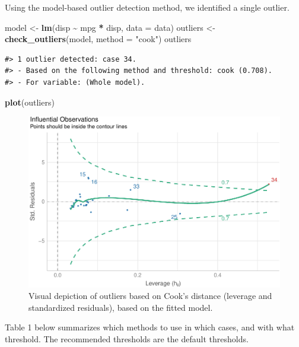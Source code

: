 \documentclass[sn-basic, lineno,pdflatex]{sn-jnl}
\newenvironment{Shaded}{\begin{snugshade}}{\end{snugshade}}
\newcommand{\AttributeTok}[1]{\textcolor[rgb]{0.13,0.29,0.53}{#1}}
\newcommand{\FunctionTok}[1]{\textcolor[rgb]{0.13,0.29,0.53}{\textbf{#1}}}
\newcommand{\NormalTok}[1]{#1}
\newcommand{\OtherTok}[1]{\textcolor[rgb]{0.56,0.35,0.01}{#1}}
\newcommand{\SpecialCharTok}[1]{\textcolor[rgb]{0.81,0.36,0.00}{\textbf{#1}}}
\newcommand{\StringTok}[1]{\textcolor[rgb]{0.31,0.60,0.02}{#1}}
\begin{document}
Using the model-based outlier detection method, we identified a single
outlier.

\begin{Shaded}
\begin{Highlighting}[]
\NormalTok{model }\OtherTok{\textless{}{-}} \FunctionTok{lm}\NormalTok{(disp }\SpecialCharTok{\textasciitilde{}}\NormalTok{ mpg }\SpecialCharTok{*}\NormalTok{ disp, }\AttributeTok{data =}\NormalTok{ data)}
\NormalTok{outliers }\OtherTok{\textless{}{-}} \FunctionTok{check\_outliers}\NormalTok{(model, }\AttributeTok{method =} \StringTok{"cook"}\NormalTok{)}
\NormalTok{outliers}
\end{Highlighting}
\end{Shaded}

\begin{verbatim}
#> 1 outlier detected: case 34.
#> - Based on the following method and threshold: cook (0.708).
#> - For variable: (Whole model).
\end{verbatim}

\begin{Shaded}
\begin{Highlighting}[]
\FunctionTok{plot}\NormalTok{(outliers)}
\end{Highlighting}
\end{Shaded}

\begin{figure}
\includegraphics[width=1\linewidth]{paper_files/figure-latex/model_fig-1} \caption{Visual depiction of outliers based on Cook's distance (leverage and standardized residuals), based on the fitted model.}\label{fig:model_fig}
\end{figure}

Table 1 below summarizes which methods to use in which cases, and with
what threshold. The recommended thresholds are the default thresholds.
\end{document}
